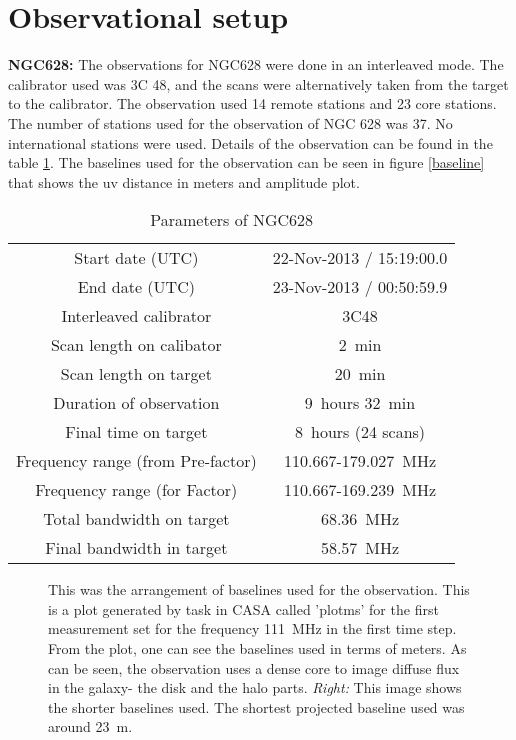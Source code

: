 \documentclass[../main/thesis_msc.tex]{subfiles}
\begin{document}
\section{Observational setup}
\textbf{NGC628:} The observations for NGC628 were done in an interleaved mode. The calibrator used was 3C 48, and the scans were alternatively taken from the target to the calibrator. The observation used 14 remote stations and 23 core stations. The number of stations used for the observation of NGC 628 was 37. No international stations were used. Details of the observation can be found in the table \ref{setup}. The baselines used for the observation can be seen in figure \ref{baseline} that shows the uv distance in meters and amplitude plot. 
\begin{table}[h]
        \centering
        \begin{tabular}{cc}
            \hline\hline
            Start date (UTC) & 22-Nov-2013 / 15:19:00.0 \\ 
            End date (UTC) & 23-Nov-2013 / 00:50:59.9\\
            Interleaved calibrator & 3C48\\
            Scan length on calibator & 2~min\\
            Scan length on target & 20~min\\
            Duration of observation & 9~hours 32~min\\
            Final time on target & 8~hours (24 scans)\\
            Frequency range (from Pre-factor) & 110.667-179.027~MHz\\
            Frequency range (for Factor) & 110.667-169.239~MHz\\
            Total bandwidth on target & 68.36~MHz\\
            Final bandwidth in target & 58.57~MHz\\
             \hline
        \end{tabular}
        \caption{Parameters of NGC628}
        \label{setup}
    \end{table}

\begin{figure}[h]
	\centering
	\caption{This was the arrangement of baselines used for the observation. This is a plot generated by task in CASA called 'plotms' for the first measurement set for the frequency 111~MHz in the first time step. From the plot, one can see the baselines used in terms of meters. As can be seen, the observation uses a dense core to image diffuse flux in the galaxy- the disk and the halo parts. \textit{Right:} This image shows the shorter baselines used. The shortest projected baseline used was around 23~m. }
	\label{faceting}
	\end{figure}
\end{document}
